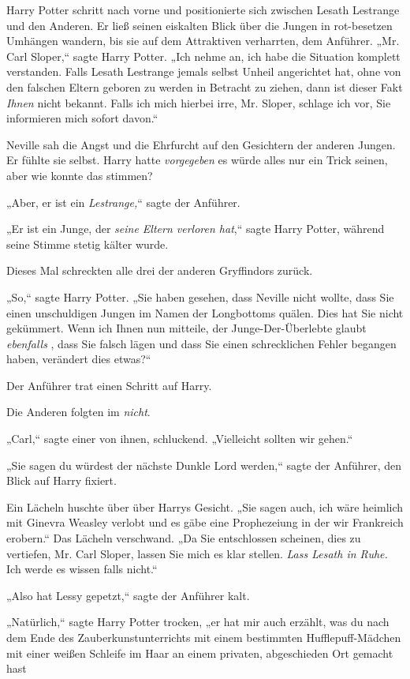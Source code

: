 {Harry Potter schritt nach vorne und positionierte sich zwischen Lesath Lestrange und den Anderen. Er ließ seinen eiskalten Blick über die Jungen in rot-besetzen Umhängen wandern, bis sie auf dem Attraktiven verharrten, dem Anführer. „Mr. Carl Sloper,“ sagte Harry Potter. „Ich nehme an, ich habe die Situation komplett verstanden. Falls Lesath Lestrange jemals selbst Unheil angerichtet hat, ohne von den falschen Eltern geboren zu werden in Betracht zu ziehen, dann ist dieser Fakt \emph{Ihnen} nicht bekannt. Falls ich mich hierbei irre, Mr. Sloper, schlage ich vor, Sie informieren mich sofort davon.“

Neville sah die Angst und die Ehrfurcht auf den Gesichtern der anderen Jungen. Er fühlte sie selbst. Harry hatte \emph{vorgegeben} es würde alles nur ein Trick seinen, aber wie konnte das stimmen?

„Aber, er ist ein \emph{Lestrange,}“ sagte der Anführer.

„Er ist ein Junge, der \emph{seine Eltern verloren hat},“ sagte Harry Potter, während seine Stimme stetig kälter wurde.

Dieses Mal schreckten alle drei der anderen Gryffindors zurück.

„So,“ sagte Harry Potter. „Sie haben gesehen, dass Neville nicht wollte, dass Sie einen unschuldigen Jungen im Namen der Longbottoms quälen. Dies hat Sie nicht gekümmert. Wenn ich Ihnen nun mitteile, der Junge-Der-Überlebte glaubt \emph{ebenfalls} , dass Sie falsch lägen und dass Sie einen schrecklichen Fehler begangen haben, verändert dies etwas?“

Der Anführer trat einen Schritt auf Harry.

Die Anderen folgten im \emph{nicht}.

„Carl,“ sagte einer von ihnen, schluckend. „Vielleicht sollten wir gehen.“

„Sie sagen du würdest der nächste Dunkle Lord werden,“ sagte der Anführer, den Blick auf Harry fixiert.

Ein Lächeln huschte über über Harrys Gesicht. „Sie sagen auch, ich wäre heimlich mit Ginevra Weasley verlobt und es gäbe eine Prophezeiung in der wir Frankreich erobern.“ Das Lächeln verschwand. „Da Sie entschlossen scheinen, dies zu vertiefen, Mr. Carl Sloper, lassen Sie mich es klar stellen. \emph{Lass Lesath in Ruhe.} Ich werde es wissen falls nicht.“

„Also hat Lessy gepetzt,“ sagte der Anführer kalt.

„Natürlich,“ sagte Harry Potter trocken, „er hat mir auch erzählt, was du nach dem Ende des Zauberkunstunterrichts mit einem bestimmten Hufflepuff-Mädchen mit einer weißen Schleife im Haar an einem privaten, abgeschieden Ort gemacht hast \later

}
